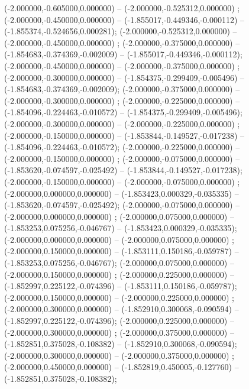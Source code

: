  (-2.000000,-0.605000,0.000000) -- (-2.000000,-0.525312,0.000000) ;
 (-2.000000,-0.450000,0.000000) -- (-1.855017,-0.449346,-0.000112) -- (-1.855374,-0.524656,0.000281);
 (-2.000000,-0.525312,0.000000) -- (-2.000000,-0.450000,0.000000) ;
 (-2.000000,-0.375000,0.000000) -- (-1.854683,-0.374369,-0.002009) -- (-1.855017,-0.449346,-0.000112);
 (-2.000000,-0.450000,0.000000) -- (-2.000000,-0.375000,0.000000) ;
 (-2.000000,-0.300000,0.000000) -- (-1.854375,-0.299409,-0.005496) -- (-1.854683,-0.374369,-0.002009);
 (-2.000000,-0.375000,0.000000) -- (-2.000000,-0.300000,0.000000) ;
 (-2.000000,-0.225000,0.000000) -- (-1.854096,-0.224463,-0.010572) -- (-1.854375,-0.299409,-0.005496);
 (-2.000000,-0.300000,0.000000) -- (-2.000000,-0.225000,0.000000) ;
 (-2.000000,-0.150000,0.000000) -- (-1.853844,-0.149527,-0.017238) -- (-1.854096,-0.224463,-0.010572);
 (-2.000000,-0.225000,0.000000) -- (-2.000000,-0.150000,0.000000) ;
 (-2.000000,-0.075000,0.000000) -- (-1.853620,-0.074597,-0.025492) -- (-1.853844,-0.149527,-0.017238);
 (-2.000000,-0.150000,0.000000) -- (-2.000000,-0.075000,0.000000) ;
 (-2.000000,0.000000,0.000000) -- (-1.853423,0.000329,-0.035335) -- (-1.853620,-0.074597,-0.025492);
 (-2.000000,-0.075000,0.000000) -- (-2.000000,0.000000,0.000000) ;
 (-2.000000,0.075000,0.000000) -- (-1.853253,0.075256,-0.046767) -- (-1.853423,0.000329,-0.035335);
 (-2.000000,0.000000,0.000000) -- (-2.000000,0.075000,0.000000) ;
 (-2.000000,0.150000,0.000000) -- (-1.853111,0.150186,-0.059787) -- (-1.853253,0.075256,-0.046767);
 (-2.000000,0.075000,0.000000) -- (-2.000000,0.150000,0.000000) ;
 (-2.000000,0.225000,0.000000) -- (-1.852997,0.225122,-0.074396) -- (-1.853111,0.150186,-0.059787);
 (-2.000000,0.150000,0.000000) -- (-2.000000,0.225000,0.000000) ;
 (-2.000000,0.300000,0.000000) -- (-1.852910,0.300068,-0.090594) -- (-1.852997,0.225122,-0.074396);
 (-2.000000,0.225000,0.000000) -- (-2.000000,0.300000,0.000000) ;
 (-2.000000,0.375000,0.000000) -- (-1.852851,0.375028,-0.108382) -- (-1.852910,0.300068,-0.090594);
 (-2.000000,0.300000,0.000000) -- (-2.000000,0.375000,0.000000) ;
 (-2.000000,0.450000,0.000000) -- (-1.852819,0.450005,-0.127760) -- (-1.852851,0.375028,-0.108382);
